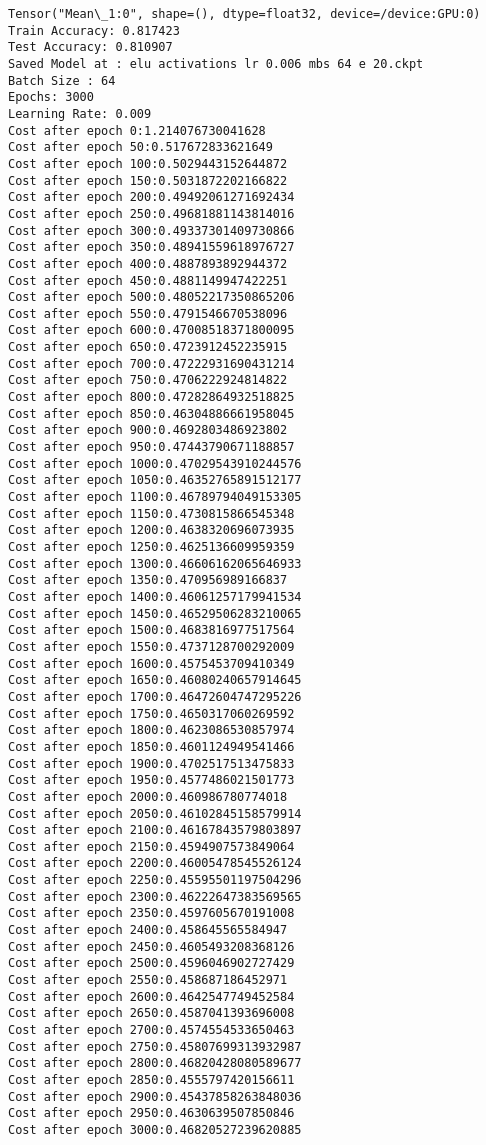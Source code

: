 \documentclass[11pt]{article}
\begin{document}
    \begin{Verbatim}[commandchars=\\\{\}]
Tensor("Mean\_1:0", shape=(), dtype=float32, device=/device:GPU:0)
Train Accuracy: 0.817423
Test Accuracy: 0.810907
Saved Model at : elu activations lr 0.006 mbs 64 e 20.ckpt
Batch Size : 64
Epochs: 3000
Learning Rate: 0.009  
Cost after epoch 0:1.214076730041628
Cost after epoch 50:0.517672833621649
Cost after epoch 100:0.5029443152644872
Cost after epoch 150:0.5031872202166822
Cost after epoch 200:0.49492061271692434
Cost after epoch 250:0.49681881143814016
Cost after epoch 300:0.49337301409730866
Cost after epoch 350:0.48941559618976727
Cost after epoch 400:0.4887893892944372
Cost after epoch 450:0.4881149947422251
Cost after epoch 500:0.48052217350865206
Cost after epoch 550:0.4791546670538096
Cost after epoch 600:0.47008518371800095
Cost after epoch 650:0.4723912452235915
Cost after epoch 700:0.47222931690431214
Cost after epoch 750:0.4706222924814822
Cost after epoch 800:0.47282864932518825
Cost after epoch 850:0.46304886661958045
Cost after epoch 900:0.4692803486923802
Cost after epoch 950:0.47443790671188857
Cost after epoch 1000:0.47029543910244576
Cost after epoch 1050:0.46352765891512177
Cost after epoch 1100:0.46789794049153305
Cost after epoch 1150:0.4730815866545348
Cost after epoch 1200:0.4638320696073935
Cost after epoch 1250:0.4625136609959359
Cost after epoch 1300:0.46606162065646933
Cost after epoch 1350:0.470956989166837
Cost after epoch 1400:0.46061257179941534
Cost after epoch 1450:0.46529506283210065
Cost after epoch 1500:0.4683816977517564
Cost after epoch 1550:0.4737128700292009
Cost after epoch 1600:0.4575453709410349
Cost after epoch 1650:0.46080240657914645
Cost after epoch 1700:0.46472604747295226
Cost after epoch 1750:0.4650317060269592
Cost after epoch 1800:0.4623086530857974
Cost after epoch 1850:0.4601124949541466
Cost after epoch 1900:0.4702517513475833
Cost after epoch 1950:0.4577486021501773
Cost after epoch 2000:0.460986780774018
Cost after epoch 2050:0.46102845158579914
Cost after epoch 2100:0.46167843579803897
Cost after epoch 2150:0.4594907573849064
Cost after epoch 2200:0.46005478545526124
Cost after epoch 2250:0.45595501197504296
Cost after epoch 2300:0.46222647383569565
Cost after epoch 2350:0.4597605670191008
Cost after epoch 2400:0.458645565584947
Cost after epoch 2450:0.4605493208368126
Cost after epoch 2500:0.4596046902727429
Cost after epoch 2550:0.458687186452971
Cost after epoch 2600:0.4642547749452584
Cost after epoch 2650:0.4587041393696008
Cost after epoch 2700:0.4574554533650463
Cost after epoch 2750:0.45807699313932987
Cost after epoch 2800:0.46820428080589677
Cost after epoch 2850:0.4555797420156611
Cost after epoch 2900:0.45437858263848036
Cost after epoch 2950:0.4630639507850846
Cost after epoch 3000:0.46820527239620885

    \end{Verbatim}
\end{document}
